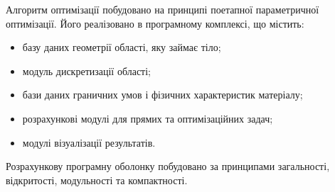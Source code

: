 Алгоритм оптимізації побудовано на принципі поетапної параметричної оптимізації. Його реалізовано в програмному комплексі, що містить:
\begin{itemize}[nosep,leftmargin=2em]
  \item базу даних геометрії області, яку займає тіло;
  \item модуль дискретизації області;
  \item бази даних граничних умов і фізичних характеристик матеріалу;
  \item розрахункові модулі для прямих та оптимізаційних задач;
  \item модулі візуалізації результатів.
\end{itemize}

Розрахункову програмну оболонку побудовано за принципами загальності, відкритості, модульності та компактності.
